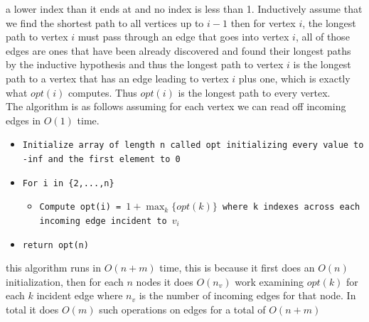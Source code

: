 \documentclass{amsart}
\begin{document}
a lower index than it ends at and no index is less than 1.
Inductively assume that we find the shortest path to all vertices up to $i-1$ then for vertex $i$, the longest path to vertex $i$ must pass
through an edge that goes into vertex $i$, all of those edges are ones that have been already discovered and found their longest paths by the inductive hypothesis
and thus the longest path to vertex $i$ is the longest path to a vertex that has an edge leading to vertex  $i$ plus one, which is exactly what $opt(i)$ computes. Thus $opt(i)$ is
the longest path to every vertex.
\\
The algorithm is as follows assuming for each vertex we can read off incoming edges in $O(1)$ time.
{\small
    \begin{itemize}
        \item \texttt{Initialize array of length n called opt initializing every value to -inf and the first element to 0}
        \item \texttt{For i in \{2,...,n\}}
            \begin{itemize}
                \item \texttt{Compute opt(i) = $1 + \max_k\{opt(k)\}$ where k indexes across each incoming edge incident to $v_i$}
            \end{itemize}
        \item \texttt{return opt(n)}
    \end{itemize}
}
this algorithm runs in $O(n+m)$ time, this is because it first does an $O(n)$ initialization, then for each $n$ nodes it does $O(n_v)$ work
examining $opt(k)$ for each $k$  incident edge where $n_v$ is the number of incoming edges for that node. In total it does $O(m)$ such operations on edges for a total of $O(n+m)$
\end{document}
